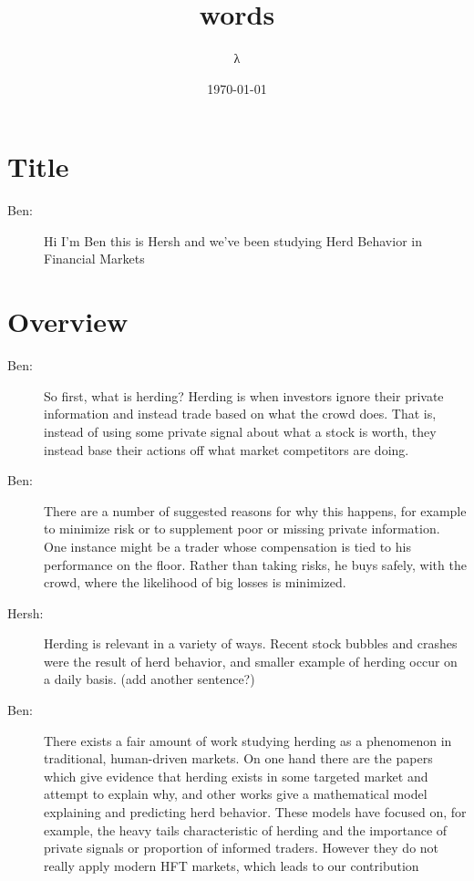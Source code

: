 \documentclass[11pt]{article}
\title{words}
\author{λ}
\date{\today}
\begin{document}

\section{Title}
\label{sec-1}
\begin{description}
  \item[Ben:] Hi I'm Ben this is Hersh and we've been studying Herd Behavior in Financial Markets
\end{description}
\section{Overview}
\label{sec-2}
\begin{description}
  \item[Ben:] So first, what is herding? Herding is when investors ignore their private information and instead trade based on what the crowd does.
       That is, instead of using some private signal about what a stock is worth, they instead base their actions off what market competitors are doing.
  \item[Ben:] There are a number of suggested reasons for why this happens, for example to minimize risk or to supplement poor or missing private information.
       One instance might be a trader whose compensation is tied to his performance on the floor. Rather than taking risks, he buys safely, with the crowd, where the likelihood of big losses is minimized.
  \item[Hersh:] Herding is relevant in a variety of ways. Recent stock bubbles and crashes were the result of herd behavior, and smaller example of herding occur on a daily basis.
         (add another sentence?)
  \item[Ben:] There exists a fair amount of work studying herding as a phenomenon in traditional, human-driven markets.
       On one hand there are the papers which give evidence that herding exists in some targeted market and attempt to explain why, and other works give a mathematical model explaining and predicting herd behavior.
       These models have focused on, for example, the heavy tails characteristic of herding and the importance of private signals or proportion of informed traders.
       However they do not really apply modern HFT markets, which leads to our contribution
\end{description}
\end{document}
